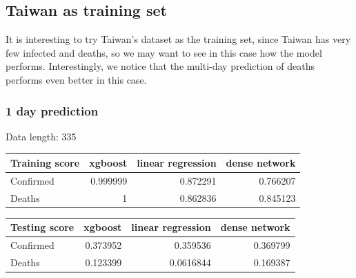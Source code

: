 \documentclass[a4paper,12pt]{article}
\begin{document}
\subsection{Taiwan as training set}
It is interesting to try Taiwan's dataset as the training set, since Taiwan has very few infected and deaths, so we may want to see in this case how the model performs. Interestingly, we notice that the multi-day prediction of deaths performs even better in this case.
\subsubsection{1 day prediction}
\begin{tcolorbox}
    Data length:	 335

    \begin{tabular}{lrrr}
    \toprule
    Training score   &   xgboost &   linear regression &   dense network \\
    \midrule
    Confirmed        &  0.999999 &            0.872291 &        0.766207 \\
    Deaths           &  1        &            0.862836 &        0.845123 \\
    \bottomrule
    \end{tabular}


    \begin{tabular}{lrrr}
    \toprule
    Testing score   &   xgboost &   linear regression &   dense network \\
    \midrule
    Confirmed       &  0.373952 &           0.359536  &        0.369799 \\
    Deaths          &  0.123399 &           0.0616844 &        0.169387 \\
    \bottomrule
    \end{tabular}

\end{tcolorbox}
\end{document}
